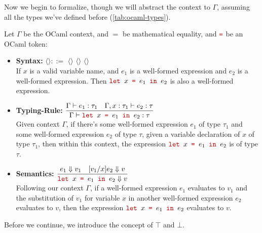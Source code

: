 \noindent
Now we begin to formalize, though we will abstract the context to $\Gamma$, assuming 
all the types we've defined before (\ref{tab:ocaml-types}).
\begin{Def}

    Let $\Gamma$ be the OCaml context, and $=$ be mathematical equality, and $\texttr{=}$ be an OCaml token:
    \begin{itemize}
        \item \textbf{Syntax:} \LARGE $\langle$$\rangle::=$  $\langle$$\rangle$ \texttr{=} $\langle$$\rangle$  $\langle$$\rangle$ \normalsize\\
        
        \vspace{-.5em}
        \noindent
        If $x$ is a valid variable name, and $e_1$ is a well-formed expression and $e_2$ is a well-formed expression. Then $\texttr{let }x\texttr{ = }e_1\texttr{ in }e_2$ is also a well-formed expression.
        \item \textbf{Typing-Rule:} \LARGE $\dfrac{\Gamma\vdash e_1:\tau_1 \quad \Gamma,x:\tau_1\vdash e_2:\tau}{\Gamma\vdash\texttr{let }x\texttr{ = }e_1\texttr{ in }e_2:\tau}$ \normalsize\\
        
        \noindent
        Given context $\Gamma$, if there's some well-formed expression $e_1$ of type $\tau_1$ and some well-formed expression $e_2$ of type $\tau$, given a variable declaration of $x$ of type $\tau_1$, 
        then within this context, the expression $\texttr{let }x\texttr{  = }e_1\texttr{ in }e_2$ is of type $\tau$.
        
        \item \textbf{Semantics:} \LARGE $\dfrac{e_1\Downarrow v_1 \quad [v_1/x]e_2\Downarrow v}{\texttr{let }x\texttr{ = }e_1\texttr{ in }e_2\Downarrow v}$ \normalsize\\
        
        \noindent
        Following our context $\Gamma$, if a well-formed expression $e_1$ evaluates to $v_1$ and the substitution of $v_1$ for variable $x$ in another 
        well-formed expression $e_2$ evaluates to $v$, then the expression $\texttr{let }x\texttr{ = }e_1\texttr{ in }e_2$ evaluates to $v$.
    \end{itemize}
\end{Def}

\newpage 

\noindent
Before we continue, we introduce the concept of $\top$ and $\bot$.

